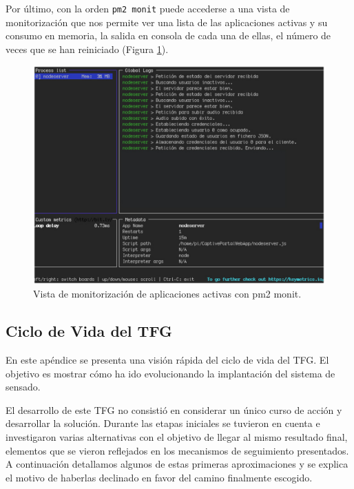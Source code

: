 \begin{appendices}
Por último, con la orden \texttt{pm2 monit} puede accederse a una vista de monitorización que nos permite ver una lista de las aplicaciones activas y su consumo en memoria, la salida en consola de cada una de ellas, el número de veces que se han reiniciado (Figura \ref{pm2monit}).

\begin{figure}[!t]
\begin{center}
\includegraphics[width=0.75\linewidth]{./X_Anexos/Img/pm2monit.png}
\end{center}
\caption{Vista de monitorización de aplicaciones activas con pm2 monit.}
\label{pm2monit}
\end{figure}
\cleardoublepage
{}%
\begin{center}
\begin{minipage}{.75\textwidth}
\section{Ciclo de Vida del TFG}\label{ApendiceD}

En este apéndice se presenta una visión rápida del ciclo de vida del TFG. El objetivo es mostrar cómo ha ido evolucionando la implantación del sistema de sensado.
\end{minipage}
\end{center}
\clearpage%

El desarrollo de este TFG no consistió en considerar un único curso de acción y desarrollar la solución. Durante las etapas iniciales se tuvieron en cuenta e investigaron varias alternativas con el objetivo de llegar al mismo resultado final, elementos que se vieron reflejados en los mecanismos de seguimiento presentados. A continuación detallamos algunos de estas primeras aproximaciones y se explica el motivo de haberlas declinado en favor del camino finalmente escogido.


\end{appendices}
